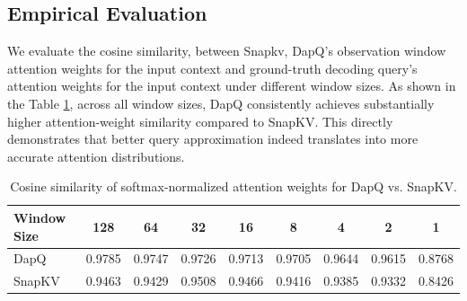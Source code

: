 \documentclass[11pt]{article}
\begin{document}
\subsection{Empirical Evaluation}

We evaluate the cosine similarity, between Snapkv, DapQ’s observation window attention weights for the input context and ground-truth decoding query’s attention weights for the input context under different window sizes. As shown in the Table \ref{table:query-attention}, across all window sizes, DapQ consistently achieves substantially higher attention-weight similarity compared to SnapKV. This directly demonstrates that better query approximation indeed translates into more accurate attention distributions.

\begin{table}[h]
\centering
\caption{Cosine similarity of softmax-normalized attention weights for DapQ vs. SnapKV.}
\label{tab:attention_comparison}
    \begin{tabular}{lcccccccc}
    \toprule
    Window Size & 128 & 64 & 32 & 16 & 8 & 4 & 2 & 1 \\
    \midrule
    DapQ        & 0.9785 & 0.9747 & 0.9726 & 0.9713 & 0.9705 & 0.9644 & 0.9615 & 0.8768 \\
    SnapKV      & 0.9463 & 0.9429 & 0.9508 & 0.9466 & 0.9416 & 0.9385 & 0.9332 & 0.8426 \\
    \bottomrule
    \end{tabular}%
\label{table:query-attention}
\end{table}





\newpage











\end{document}
